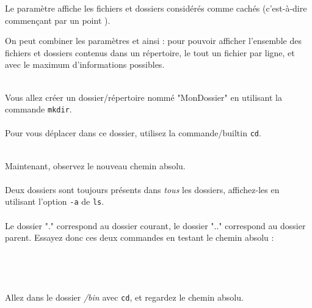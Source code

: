 \bigskip

Le paramètre  affiche les fichiers et dossiers considérés comme cachés (c'est-à-dire commençant par un point ).


\bigskip

On peut combiner les paramètres  et  ainsi :  pour pouvoir afficher l'ensemble des fichiers et dossiers contenus dans un répertoire, le tout un fichier par ligne, et avec le maximum d'informations possibles.\\

\\

\bigskip

Vous allez créer un dossier/répertoire nommé "MonDossier" en utilisant la commande \texttt{mkdir}.\\

\\

Pour vous déplacer dans ce dossier, utilisez la commande/builtin \texttt{cd}.\\

\\

\bigskip

Maintenant, observez le nouveau chemin absolu.\\

\\

Deux dossiers sont toujours présents dans \textit{tous} les dossiers, affichez-les en utilisant l'option \texttt{-a} de \texttt{ls}.\\

\\

Le dossier "." correspond au dossier courant, le dossier ".." correspond au dossier parent.
Essayez donc ces deux commandes en testant le chemin absolu :\\

\\
\\
\\
\\

Allez dans le dossier \textit{/bin} avec \texttt{cd}, et regardez le chemin absolu.\\

\\
\\

